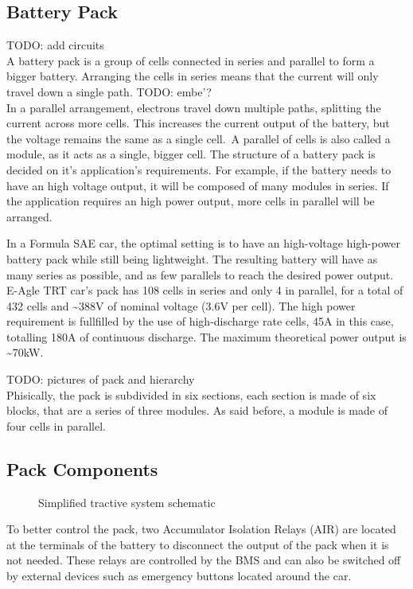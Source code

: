 \subsection{Battery Pack}
TODO: add circuits\\
A battery pack is a group of cells connected in series and parallel to form a bigger battery. Arranging the cells in series means that the current will only travel down a single path. TODO: embe'?\\
In a parallel arrangement, electrons travel down multiple paths, splitting the current across more cells. This increases the current output of the battery, but the voltage remains the same as a single cell.\ A parallel of cells is also called a module, as it acts as a single, bigger cell.
The structure of a battery pack is decided on it's application's requirements. For example, if the battery needs to have an high voltage output, it will be composed of many modules in series. If the application requires an high power output, more cells in parallel will be arranged.

In a Formula SAE car, the optimal setting is to have an high-voltage high-power battery pack while still being lightweight. The resulting battery will have as many series as possible, and as few parallels to reach the desired power output. E-Agle TRT car's pack has 108 cells in series and only 4 in parallel, for a total of 432 cells and \~{}388V of nominal voltage (3.6V per cell). The high power requirement is fullfilled by the use of high-discharge rate cells, 45A in this case, totalling 180A of continuous discharge. The maximum theoretical power output is \~{}70kW.

TODO: pictures of pack and hierarchy\\
Phisically, the pack is subdivided in six sections, each section is made of six blocks, that are a series of three modules. As said before, a module is made of four cells in parallel.

\subsection{Pack Components}
\begin{figure}[h]
    \centering
    
    \caption{Simplified tractive system schematic}
    \label{fig:tractive_system}
\end{figure}
To better control the pack, two Accumulator Isolation Relays (AIR) are located at the terminals of the battery to disconnect the output of the pack when it is not needed. These relays are controlled by the BMS and can also be switched off by external devices such as emergency buttons located around the car.

